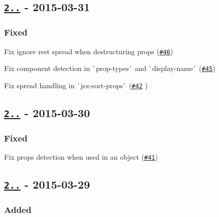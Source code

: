 \subsection*{\href{https://github.com/yannickcr/eslint-plugin-react/compare/v2.0.1...v2.0.2}{\tt 2..} -\/ 2015-\/03-\/31}

\subsubsection*{Fixed}


\begin{DoxyItemize}
\item Fix ignore rest spread when destructuring props (\href{https://github.com/yannickcr/eslint-plugin-react/issues/46}{\tt \#46})
\item Fix component detection in \`{}prop-\/types\`{} and \`{}display-\/name\`{} (\href{https://github.com/yannickcr/eslint-plugin-react/issues/45}{\tt \#45})
\item Fix spread handling in \`{}jsx-\/sort-\/props\`{} (\href{https://github.com/yannickcr/eslint-plugin-react/pull/42}{\tt \#42} )
\end{DoxyItemize}

\subsection*{\href{https://github.com/yannickcr/eslint-plugin-react/compare/v2.0.0...v2.0.1}{\tt 2..} -\/ 2015-\/03-\/30}

\subsubsection*{Fixed}


\begin{DoxyItemize}
\item Fix props detection when used in an object (\href{https://github.com/yannickcr/eslint-plugin-react/issues/41}{\tt \#41})
\end{DoxyItemize}

\subsection*{\href{https://github.com/yannickcr/eslint-plugin-react/compare/v1.6.1...v2.0.0}{\tt 2..} -\/ 2015-\/03-\/29}

\subsubsection*{Added}


